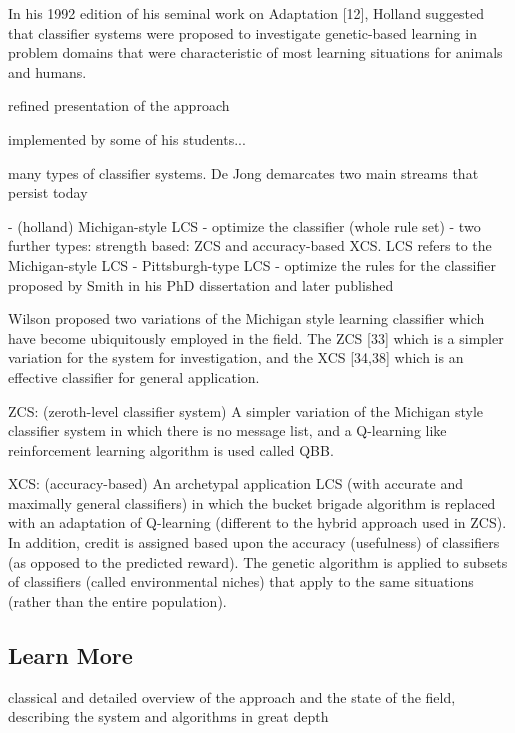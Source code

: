\documentclass[a4paper, 11pt]{article}
\begin{document}
In his 1992 edition of his seminal work on Adaptation [12], Holland suggested that classifier systems were proposed to investigate genetic-based learning in problem domains that were characteristic of most learning situations for animals and humans.

refined presentation of the approach \cite{Holland1989}

implemented by some of his students...

many types of classifier systems. De Jong demarcates two main streams that persist today \cite{Jong1988}

- (holland) Michigan-style LCS - optimize the classifier (whole rule set) 
	- two further types: strength based: ZCS and accuracy-based XCS.
LCS refers to the Michigan-style LCS
- Pittsburgh-type LCS - optimize the rules for the classifier proposed by Smith in his PhD dissertation \cite{Smith1980} and later published \cite{Smith1983}

Wilson proposed two variations of the Michigan style learning classifier which have become ubiquitously employed in the field. The ZCS [33] which is a simpler variation for the system for investigation, and the XCS [34,38] which is an effective classifier for general application.

ZCS: (zeroth-level classifier system) A simpler variation of the Michigan style classifier system in which there is no message list, and a Q-learning like reinforcement learning algorithm is used called QBB. \cite{Wilson1994}

XCS: (accuracy-based) An archetypal application LCS (with accurate and maximally general classifiers) in which the bucket brigade algorithm is replaced with an adaptation of Q-learning (different to the hybrid approach used in ZCS). In addition, credit is assigned based upon the accuracy (usefulness) of classifiers (as opposed to the predicted reward). The genetic algorithm is applied to subsets of classifiers (called environmental niches) that apply to the same situations (rather than the entire population). \cite{Wilson1995}


% 
% 
\subsection{Learn More}

classical and detailed overview of the approach and the state of the field, describing the system and algorithms in great depth \cite{Booker1989}
\end{document}
